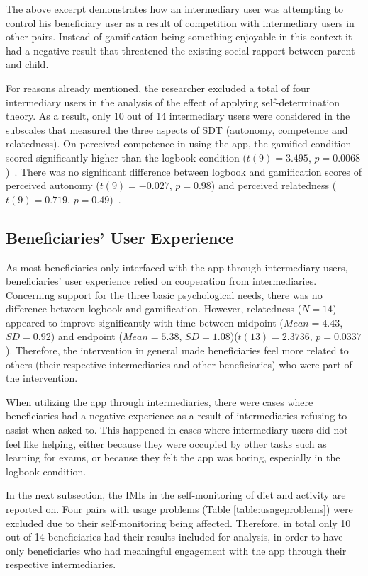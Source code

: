 The above excerpt demonstrates how an intermediary user was attempting to control his beneficiary user as a result of competition with intermediary users in other pairs. Instead of gamification being something enjoyable in this context it had a negative result that threatened the existing social rapport between parent and child. 

For reasons already mentioned, the researcher excluded a total of four intermediary users in the analysis of the effect of applying self-determination theory. As a result, only 10 out of 14 intermediary users were considered in the subscales that measured the three aspects of SDT (autonomy, competence and relatedness). On perceived competence in using the app, the gamified condition scored significantly higher than the logbook condition ($t(9)=3.495$, $p=0.0068$)~\citep{katule2016family}. There was no significant difference between logbook and gamification scores of perceived autonomy ($t(9)= -0.027$, $p= 0.98$) and perceived relatedness ($t(9)=0.719$, $p=0.49$)~\citep{katule2016family}.

\subsection{Beneficiaries' User Experience}\label{ben_user_xp}
As most beneficiaries only interfaced with the app through intermediary users, beneficiaries' user experience relied on cooperation from intermediaries. Concerning support for the three basic psychological needs, there was no difference between logbook and gamification. However, relatedness ($N=14$) appeared to improve significantly with time between midpoint ($Mean=4.43$, $SD=0.92$) and endpoint ($Mean=5.38$, $SD=1.08$)($t(13)=2.3736$, $p=0.0337$). Therefore, the intervention in general made beneficiaries feel more related to others (their respective intermediaries and other beneficiaries) who were part of the intervention.
  
When utilizing the app through intermediaries, there were cases where beneficiaries had a negative experience as a result of intermediaries refusing to assist when asked to. This happened in cases where intermediary users did not feel like helping, either because they were occupied by other tasks such as learning for exams, or because they felt the app was boring, especially in the logbook condition. 

In the next subsection, the IMIs in the self-monitoring of diet and activity are reported on. Four pairs with usage problems (Table \ref{table:usageproblems}) were excluded due to their self-monitoring being affected. Therefore, in total only 10 out of 14 beneficiaries had their results included for analysis, in order to have only beneficiaries who had meaningful engagement with the app through their respective intermediaries.
